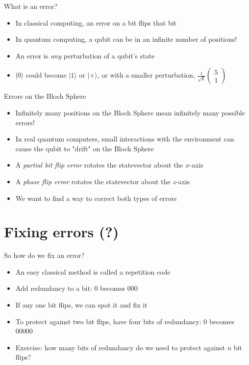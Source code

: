 \documentclass[aspectratio=169]{beamer}
\newcommand{\twovec}[2]{\begin{pmatrix} #1 \\ #2 \end{pmatrix}}
\begin{document}
\begin{frame}{What is an error?}
    \begin{itemize}
        \item In classical computing, an error on a bit flips that bit \pause
        \item In quantum computing, a qubit can be in an infinite number of positions! \pause
        \item An error is \textit{any} perturbation of a qubit's state \pause
        \item $|0\rangle$ could become $|1\rangle$ or $|+\rangle$, or with a smaller perturbation, $\frac{1}{\sqrt{6}}\twovec{5}{1}$
    \end{itemize}
\end{frame}

\begin{frame}{Errors on the Bloch Sphere}
    \begin{itemize}
        \item Infinitely many positions on the Bloch Sphere mean infinitely many possible errors! \pause
        \item In real quantum computers, small interactions with the environment can cause the qubit to "drift" on the Bloch Sphere \pause
        \item A \textit{partial bit flip error} rotates the statevector about the $x$-axis
        \item A \textit{phase flip error} rotates the statevector about the $z$-axis \pause
        \item We want to find a way to correct both types of errors
    \end{itemize}
\end{frame}

\section{Fixing errors (?)}

\begin{frame}{So how do we fix an error?}
    \begin{itemize}
        \item An easy classical method is called a \textcolor{sigma@mainblue}{repetition code} \pause
        \item Add redundancy to a bit: 0 becomes 000 \pause
        \item If any one bit flips, we can spot it and fix it \pause
        \item To protect against two bit flips, have four bits of redundancy: 0 becomes 00000 \pause
        \item \textcolor{sigma@alertred}{Exercise:} how many bits of redundancy do we need to protect against $n$ bit flips?
    \end{itemize}
\end{frame}
\end{document}
